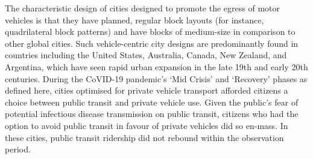 \documentclass[preprint,10pt]{elsarticle} %
\begin{document}
The characteristic design of cities designed to promote the egress of motor vehicles is that they have planned, regular block layouts (for instance, quadrilateral block patterns) and have blocks of medium-size in comparison to other global cities\cite{Thompson2020}. Such vehicle-centric city designs are predominantly found in countries including the United States, Australia, Canada, New Zealand, and Argentina, which have seen rapid urban expansion in the late 19th and early 20th centuries. During the CoVID-19 pandemic's `Mid Crisis' and `Recovery' phases as defined here, cities optimised for private vehicle transport afforded citizens a choice between public transit and private vehicle use. Given the public's fear of potential infectious disease transmission on public transit\cite{fernando2023shaping}, citizens who had the option to avoid public transit in favour of private vehicles did so en-mass. In these cities, public transit ridership did not rebound within the observation period. 
\end{document}
